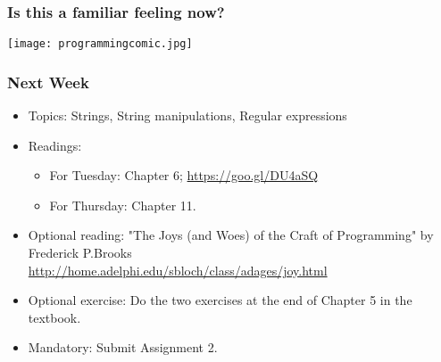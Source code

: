 \documentclass{beamer}
\begin{document}
\begin{frame}
\frametitle{Is this a familiar feeling now?}
\texttt{[image: programmingcomic.jpg]}
\end{frame}

\begin{frame}
\frametitle{Next Week}
\begin{itemize}
\item Topics: Strings, String manipulations, Regular expressions
\item Readings:
\begin{itemize}
\item For Tuesday: Chapter 6; \url{https://goo.gl/DU4aSQ}
\item For Thursday: Chapter 11. 
\end{itemize}
\item Optional reading: "The Joys (and Woes) of the Craft of Programming" by Frederick P.Brooks \\
\url{http://home.adelphi.edu/sbloch/class/adages/joy.html}
\item Optional exercise: Do the two exercises at the end of Chapter 5 in the textbook.
\item Mandatory: Submit Assignment 2. 
\end{itemize}
\end{frame}
\end{document}
